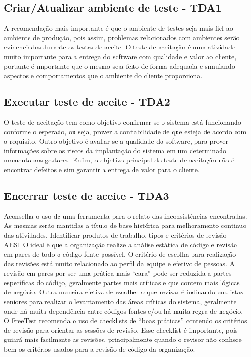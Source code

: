\subsection{Criar/Atualizar ambiente de teste - TDA1}
\label{sec:guiatda1}

A recomendação mais importante é que o ambiente de testes seja mais fiel ao ambiente de produção, pois assim, problemas relacionados com ambientes serão evidenciados durante os testes de aceite. O teste de aceitação é uma atividade muito importante para a entrega do software com qualidade e valor ao cliente, portante é importante que o mesmo seja feito de forma adequada e simulando aspectos e comportamentos que o ambiente do cliente proporciona.

\subsection{Executar teste de aceite - TDA2}
\label{sec:guiatda2}

O teste de aceitação tem como objetivo confirmar se o sistema está funcionando conforme o esperado, ou seja, prover a confiabilidade de que esteja de acordo com o requisito. Outro objetivo é avaliar se a qualidade do software, para prover informações sobre os riscos da implantação do sistema em um determinado momento aos gestores. Enfim, o objetivo principal do teste de aceitação não é encontrar defeitos e sim garantir a entrega de valor para o cliente.

\subsection{Encerrar teste de aceite - TDA3}
\label{sec:guiatda3}

Aconselha o uso de uma ferramenta para o relato das inconsistências encontradas. As mesmas serão mantidas a título de base histórica para melhoramento continuo das atividades.
Identificar produtos de trabalho, tipos e critérios de revisão - AES1
O ideal é que a organização realize a análise estática de código e revisão em pares de todo o código fonte possível. O critério de escolha para realização das revisões está muito relacionado ao perfil da equipe e efetivo de pessoas.
A revisão em pares por ser uma prática mais “cara” pode ser reduzida a partes específicas do código, geralmente partes mais críticas e que contem mais lógicas de negócio. Outra maneira efetiva de escolher o que revisar é indicando analistas seniores para realizar o levantamento das áreas críticas do sistema, geralmente onde há muita dependência entre códigos fontes e/ou há muita regra de negócio.
O FreeTest recomenda o uso de checklists de “boas práticas” contendo os critérios de revisão para orientar as sessões de revisão. Esse checklist é importante, pois guiará mais facilmente as revisões, principalmente quando o revisor não conhece bem os critérios usados para a revisão de código da organização.

